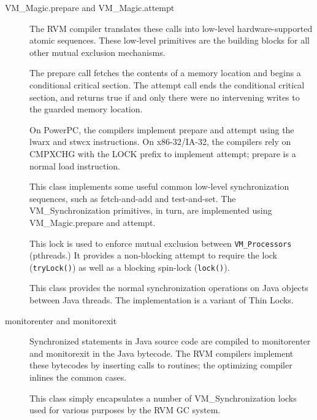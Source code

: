 \begin{description}

\item[VM\_Magic.prepare and VM\_Magic.attempt]

The RVM compiler translates these 
calls into low-level
hardware-supported atomic sequences.  These low-level primitives are the 
building blocks for all other mutual exclusion mechanisms. 

The prepare call fetches the
contents of a memory location and begins a conditional critical section.
The attempt call ends the conditional critical section, and returns true
if and only there were no intervening writes to the guarded memory
location.

On PowerPC, the compilers implement prepare and attempt using the
{\instruction lwarx}
and {\instruction stwcx} instructions.  On x86-32\-/\-IA-32, the compilers rely on
{\instruction CMPXCHG} with the
LOCK prefix to implement attempt; prepare is a normal {\instruction load} instruction.

\item[]

This class implements some useful common low-level synchronization
sequences, such as fetch-and-add and test-and-set.  The VM\_Synchronization
primitives, in turn, are implemented using VM\_Magic.prepare and attempt.

\item[]%

This lock is used to enforce mutual exclusion between {\tt VM\-\_\-Pro\-ces\-sors}
(p\-threads.)  It provides a non-blocking attempt to require the lock
({\tt tryLock()}) as well as a blocking spin-lock ({\tt lock()}).

\item[]%

This class provides the normal synchronization operations on Java objects
between Java threads.  The implementation is a variant of Thin Locks.

\item[{\instruction monitorenter} and {\instruction monitorexit}]

Synchronized statements in Java source code are compiled to
{\instruction monitorenter}
and {\instruction monitorexit} in the Java bytecode.  The RVM compilers implement these
bytecodes by inserting calls to  routines; 
the optimizing
compiler inlines the common cases.

\item[]%

This class simply encapsulates a number of VM\_Synchronization locks 
used for various purposes by the RVM GC system.

\end{description}

